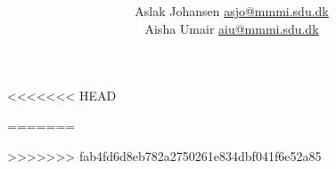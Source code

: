 \usepackage[english]{babel} %
\usepackage{graphics} %
\usepackage{hyperref} %
\usepackage{xcolor} %
\usepackage{enumitem} %
\usepackage{graphicx} %
\usepackage{pdfpages} %
<<<<<<< HEAD
\usepackage{footnote} %
=======
\usepackage{longtable} %
\usepackage{colortbl} %
\usepackage{multirow} %
>>>>>>> fab4fd6d8eb782a2750261e834dbf041f6e52a85

\makeatletter\AtBeginDocument{\let\@elt\relax}\makeatother

\setlength{\parindent}{0em} %
\setlength{\parskip}{1em} %

\newcommand{\textdesc}[1]{\textit{\textbf{#1}}}
\newcommand{\descitem}[1]{\item \textdesc{#1}}

\title{\documenttitle\\\scalebox{0.85}{\documentsubtitle}}
\author{Aslak Johansen \href{mailto:asjo@mmmi.sdu.dk}{asjo@mmmi.sdu.dk}\\Aisha Umair \href{mailto:aiu@mmmi.sdu.dk}{aiu@mmmi.sdu.dk}}



\maketitle
\setcounter{tocdepth}{2}
\tableofcontentswrapper
